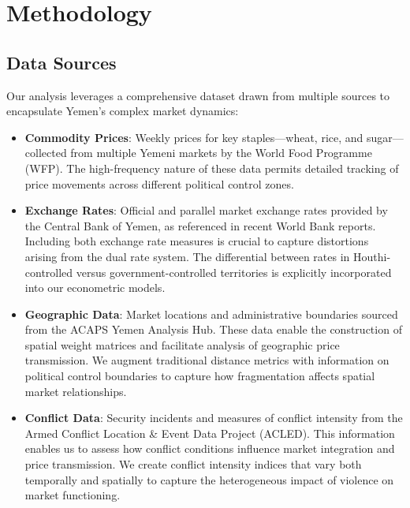 \section{Methodology}

\subsection{Data Sources}

Our analysis leverages a comprehensive dataset drawn from multiple sources to encapsulate Yemen's complex market dynamics:

\begin{itemize}
    \item \textbf{Commodity Prices}: Weekly prices for key staples—wheat, rice, and sugar—collected from multiple Yemeni markets by the World Food Programme (WFP). The high-frequency nature of these data permits detailed tracking of price movements across different political control zones.

    \item \textbf{Exchange Rates}: Official and parallel market exchange rates provided by the Central Bank of Yemen, as referenced in recent World Bank reports.\autocite{worldbank2022} Including both exchange rate measures is crucial to capture distortions arising from the dual rate system. The differential between rates in Houthi-controlled versus government-controlled territories is explicitly incorporated into our econometric models.

    \item \textbf{Geographic Data}: Market locations and administrative boundaries sourced from the ACAPS Yemen Analysis Hub. These data enable the construction of spatial weight matrices and facilitate analysis of geographic price transmission.\autocite{anselin1988} We augment traditional distance metrics with information on political control boundaries to capture how fragmentation affects spatial market relationships.

    \item \textbf{Conflict Data}: Security incidents and measures of conflict intensity from the Armed Conflict Location \& Event Data Project (ACLED). This information enables us to assess how conflict conditions influence market integration and price transmission.\autocite{mansour2021} We create conflict intensity indices that vary both temporally and spatially to capture the heterogeneous impact of violence on market functioning.
\end{itemize}

